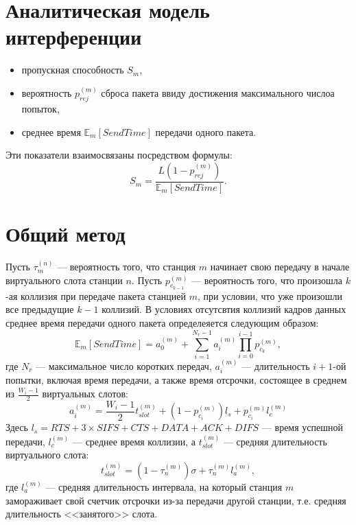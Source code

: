 {
\newcommand{\prej}[1]{p_{rej}^{(#1)}}
\newcommand{\Est}[1]{\mathbb{E}_{#1}[SendTime]}
\newcommand{\tst}[2]{\tau_{#1}^{(#2)}}
\newcommand{\pc}[2]{p_{c_{#1}}^{(#2)}}
\newcommand{\at}[2]{a_{#1}^{(#2)}}
\newcommand{\lc}[1]{l_{c}^{(#1)}}
\newcommand{\ls}[1]{l_{s}^{(#1)}}
\newcommand{\la}[1]{l_{a}^{(#1)}}
\newcommand{\tslot}[1]{t_{slot}^{(#1)}}

\section{Аналитическая модель интерференции}
\begin{itemize}
\item пропускная способность $S_m$,
\item вероятность $\prej{m}$ сброса пакета ввиду достижения максимального числоа попыток,
\item среднее время $\Est{m}$ передачи одного пакета.
\end{itemize}
Эти показатели взаимосвязаны посредством формулы:
\begin{equation}
S_m = \frac{L(1-\prej{m})}{\Est{m}}.
\end{equation}

\section{Общий метод}
Пусть $\tst{m}{n}$ --- вероятность того, что станция $m$ начинает свою передачу в начале виртуального слота станции $n$. Пусть $\pc{k-1}{m}$ --- вероятность того, что произошла $k$-ая коллизия при передаче пакета станцией $m$, при условии, что уже произошли все предыдущие $k-1$ коллизий. В условиях отсутсвтия коллизий кадров данных среднее время передачи одного пакета определеяется следующим образом:
\begin{equation}
\Est{m} = \at{0}{m} + \sum\limits_{i = 1}^{N_r - 1} \at{i}{m}
				\prod\limits_{i=0}^{i-1}\pc{k}{m},
\end{equation} 
где $N_r$ --- максимальное число коротких передач, $\at{i}{m}$ --- длительность $i+1$-ой попытки, включая время передачи, а также время отсрочки, состоящее в среднем из $\frac{W_i-1}{2}$ виртуальных слотов:
\begin{equation}
\at{i}{m} = \frac{W_i-1}{2}\tslot{m} + (1-\pc{i}{m})l_s + \pc{i}{m} \lc{m}
\end{equation}
Здесь  $l_s = RTS + 3\times SIFS + CTS + DATA + ACK + DIFS$ --- время успешной передачи, $\lc{m}$ --- среднее время коллизии, а $\tslot{m}$ --- средняя длительность виртуального слота:
\begin{equation}
\tslot{m} = (1 - \tst{n}{m})\sigma  + \tst{n}{m}\la{m},
\end{equation}
где $\la{m}$ --- средняя длительность интервала, на который станция $m$ замораживает свой счетчик отсрочки из-за передачи другой станции, т.е. средняя длительность <<занятого>> слота.

}
